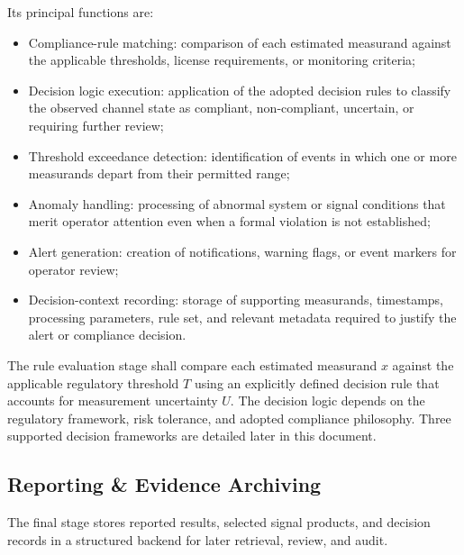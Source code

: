 \documentclass[11pt]{article}
\begin{document}
Its principal functions are:
\begin{itemize}
    \item Compliance-rule matching: comparison of each estimated measurand against the applicable thresholds, license requirements, or monitoring criteria;
    \item Decision logic execution: application of the adopted decision rules to classify the observed channel state as compliant, non-compliant, uncertain, or requiring further review;
    \item Threshold exceedance detection: identification of events in which one or more measurands depart from their permitted range;
    \item Anomaly handling: processing of abnormal system or signal conditions that merit operator attention even when a formal violation is not established;
    \item Alert generation: creation of notifications, warning flags, or event markers for operator review;
    \item Decision-context recording: storage of supporting measurands, timestamps, processing parameters, rule set, and relevant metadata required to justify the alert or compliance decision.
\end{itemize}

The rule evaluation stage shall compare each estimated measurand $x$ against the applicable regulatory threshold $T$ using an explicitly defined decision rule that accounts for measurement uncertainty $U$. The decision logic depends on the regulatory framework, risk tolerance, and adopted compliance philosophy. Three supported decision frameworks are detailed later in this document.

\subsection*{Reporting \& Evidence Archiving}

The final stage stores reported results, selected signal products, and decision records in a structured backend for later retrieval, review, and audit.
\end{document}
